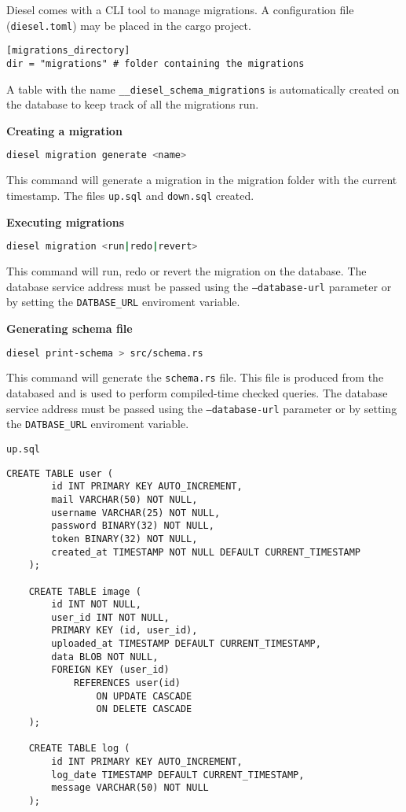 \documentclass[../documentation.tex]{subfiles}
\begin{document}
Diesel comes with a CLI tool to manage migrations.
A configuration file (\texttt{diesel.toml}) may be placed in the cargo project.

\begin{lstlisting}[style=toml, numbers=none]
[migrations_directory]
dir = "migrations" # folder containing the migrations
\end{lstlisting}

A table with the name \texttt{\_\_diesel\_schema\_migrations}
is automatically created on the database to keep track of all the migrations
run.


\textbf{Creating a migration}
\begin{lstlisting}[language=bash]
    diesel migration generate <name>
\end{lstlisting}
This command will generate a migration in the migration folder with the current timestamp.
The files \texttt{up.sql} and \texttt{down.sql} created.

\textbf{Executing migrations}
\begin{lstlisting}[language=bash]
    diesel migration <run|redo|revert>
\end{lstlisting}
This command will run, redo or revert the migration on the database.
The database service address must be passed using
the \texttt{--database-url} parameter or by setting the \texttt{DATBASE\_URL}
enviroment variable.

\textbf{Generating schema file}
\begin{lstlisting}[language=bash]
    diesel print-schema > src/schema.rs
\end{lstlisting}
This command will generate the \texttt{schema.rs} file.
This file is produced from the databased and is used to
perform compiled-time checked queries.
The database service address must be passed using
the \texttt{--database-url} parameter or by setting the \texttt{DATBASE\_URL}
enviroment variable.

\pagebreak

\texttt{up.sql}
\begin{lstlisting}[style=sql]
    CREATE TABLE user (
        id INT PRIMARY KEY AUTO_INCREMENT,
        mail VARCHAR(50) NOT NULL,
        username VARCHAR(25) NOT NULL,
        password BINARY(32) NOT NULL,
        token BINARY(32) NOT NULL,
        created_at TIMESTAMP NOT NULL DEFAULT CURRENT_TIMESTAMP
    );
    
    CREATE TABLE image (
        id INT NOT NULL,
        user_id INT NOT NULL,
        PRIMARY KEY (id, user_id),
        uploaded_at TIMESTAMP DEFAULT CURRENT_TIMESTAMP,
        data BLOB NOT NULL,
        FOREIGN KEY (user_id)
            REFERENCES user(id)
                ON UPDATE CASCADE
                ON DELETE CASCADE
    );
    
    CREATE TABLE log (
        id INT PRIMARY KEY AUTO_INCREMENT,
        log_date TIMESTAMP DEFAULT CURRENT_TIMESTAMP,
        message VARCHAR(50) NOT NULL
    );
\end{lstlisting}
\end{document}
